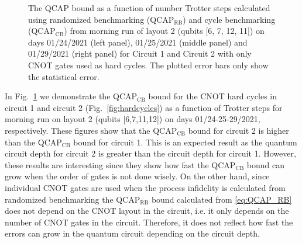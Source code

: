 \begin{figure}[htpb]
    \caption{The QCAP bound as a function of number Trotter steps calculated using randomized benchmarking (QCAP$_{\text{RB}}$) and cycle  benchmarking (QCAP$_{\text{CB}}$) from morning run of layout 2 (qubits [6, 7, 12, 11]) on days 01/24/2021 (left panel), 01/25/2021 (middle panel) and 01/29/2021 (right panel) for Circuit 1 and Circuit 2 with only CNOT gates used as hard cycles. The  plotted  error  bars  only show the statistical error.}
    \label{fig:QCAP_circ1_circ2_24th_25th_29th_L2_Morning}
\end{figure}
In Fig.~\ref{fig:QCAP_circ1_circ2_24th_25th_29th_L2_Morning} we demonstrate the QCAP$_{\text{CB}}$ bound for the CNOT hard cycles in circuit 1 and circuit 2 (Fig.~\ref{fig:hardcycles}) as a function of Trotter steps for morning run on layout 2 (qubits [6,7,11,12]) on days 01/24-25-29/2021, respectively. These figures show that the QCAP$_{\text{CB}}$ bound for circuit 2 is higher than the QCAP$_{\text{CB}}$ bound for circuit 1. This is an expected result as the quantum circuit depth for circuit 2 is greater than the circuit depth for circuit 1. However, these results are interesting since they show how fast the QCAP$_{\text{CB}}$ bound can grow when the order of gates is not done wisely. On the other hand, since individual CNOT gates are used when the process infidelity is calculated from randomized benchmarking the QCAP$_{\text{RB}}$ bound calculated from \eqref{eq:QCAP_RB} does not depend on the CNOT layout in the circuit, i.e. it only depends on the number of CNOT gates in the circuit. Therefore, it does not reflect how fast the errors can grow in the quantum circuit depending on the circuit depth.